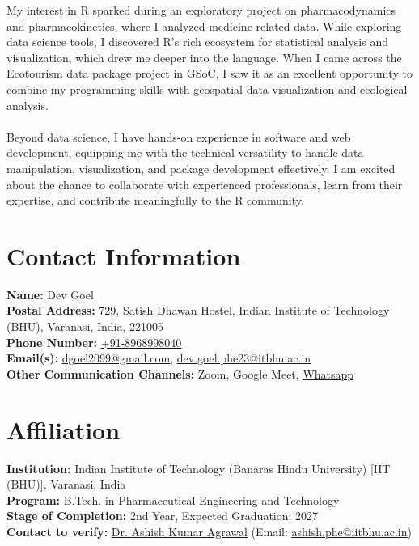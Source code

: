 \documentclass{article}
\begin{document}
My interest in R sparked during an exploratory project on pharmacodynamics and pharmacokinetics, where I analyzed medicine-related data. While exploring data science tools, I discovered R’s rich ecosystem for statistical analysis and visualization, which drew me deeper into the language. When I came across the Ecotourism data package project in GSoC, I saw it as an excellent opportunity to combine my programming skills with geospatial data visualization and ecological analysis.
\\ \\
Beyond data science, I have hands-on experience in software and web development, equipping me with the technical versatility to handle data manipulation, visualization, and package development effectively. I am excited about the chance to collaborate with experienced professionals, learn from their expertise, and contribute meaningfully to the R community.

\section{Contact Information}
{\bfseries Name:} Dev Goel \\[0.2cm]
{\bfseries Postal Address:} 729, Satish Dhawan Hostel, Indian Institute of Technology (BHU), Varanasi, India, 221005 \\[0.2cm]
{\bfseries Phone Number:} {\uline{\href{tel:+91-8968998040}{+91-8968998040}}} \\[0.2cm]
{\bfseries Email(s):} {\uline{\href{mailto:dgoel2099@gmail.com}{dgoel2099@gmail.com}}, \uline{\href{mailto:dev.goel.phe23@itbhu.ac.in}{dev.goel.phe23@itbhu.ac.in}}} \\[0.2cm]
{\bfseries Other Communication Channels:} Zoom, Google Meet, {\uline{\href{https://wa.me/918968998040}{Whatsapp}}}

\section{Affiliation}
{\bfseries Institution:} Indian Institute of Technology (Banaras Hindu University) [IIT (BHU)], Varanasi, India \\[0.2cm]
{\bfseries Program:} B.Tech. in Pharmaceutical Engineering and Technology \\[0.2cm]
{\bfseries Stage of Completion:} 2nd Year, Expected Graduation: 2027 \\[0.2cm]
{\bfseries Contact to verify:} {\uline{\href{https://www.iitbhu.ac.in/dept/phe/people/ashishphe}{Dr. Ashish Kumar Agrawal}} (Email: \uline{\href{mailto: ashish.phe@iitbhu.ac.in}{ashish.phe@iitbhu.ac.in}})}
\end{document}
